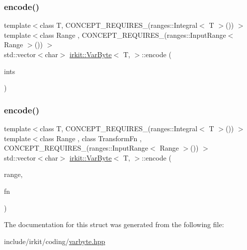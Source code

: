 \subsubsection{\texorpdfstring{encode()}{encode()}\hspace{0.1cm}{\footnotesize\ttfamily [2/3]}}
{\footnotesize\ttfamily template$<$class T, C\+O\+N\+C\+E\+P\+T\+\_\+\+R\+E\+Q\+U\+I\+R\+E\+S\+\_\+(ranges\+::\+Integral$<$ T $>$()) $>$ \\
template$<$class Range , C\+O\+N\+C\+E\+P\+T\+\_\+\+R\+E\+Q\+U\+I\+R\+E\+S\+\_\+(ranges\+::\+Input\+Range$<$ Range $>$()) $>$ \\
std\+::vector$<$char$>$ \mbox{\hyperlink{structirkit_1_1VarByte}{irkit\+::\+Var\+Byte}}$<$ T, $>$\+::encode (\begin{DoxyParamCaption}\item[{const Range \&}]{ints }\end{DoxyParamCaption})\hspace{0.3cm}{\ttfamily [inline]}}

\mbox{\label{structirkit_1_1VarByte_a9125fe467a53a0556bd642c09d5d2d27}} 
\subsubsection{\texorpdfstring{encode()}{encode()}\hspace{0.1cm}{\footnotesize\ttfamily [3/3]}}
{\footnotesize\ttfamily template$<$class T, C\+O\+N\+C\+E\+P\+T\+\_\+\+R\+E\+Q\+U\+I\+R\+E\+S\+\_\+(ranges\+::\+Integral$<$ T $>$()) $>$ \\
template$<$class Range , class Transform\+Fn , C\+O\+N\+C\+E\+P\+T\+\_\+\+R\+E\+Q\+U\+I\+R\+E\+S\+\_\+(ranges\+::\+Input\+Range$<$ Range $>$()) $>$ \\
std\+::vector$<$char$>$ \mbox{\hyperlink{structirkit_1_1VarByte}{irkit\+::\+Var\+Byte}}$<$ T, $>$\+::encode (\begin{DoxyParamCaption}\item[{const Range \&}]{range,  }\item[{Transform\+Fn}]{fn }\end{DoxyParamCaption})\hspace{0.3cm}{\ttfamily [inline]}}



The documentation for this struct was generated from the following file\+:\begin{DoxyCompactItemize}
\item 
include/irkit/coding/\mbox{\hyperlink{varbyte_8hpp}{varbyte.\+hpp}}\end{DoxyCompactItemize}
